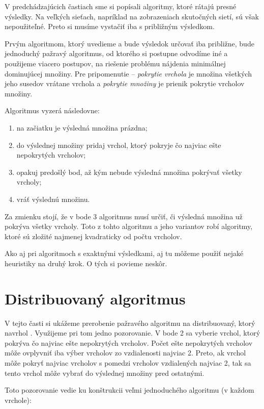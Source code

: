 V predchádzajúcich častiach sme si popísali algoritmy, ktoré rátajú presné 
výsledky. Na veľkých sieťach, napríklad na zobrazeniach skutočných sietí, 
sú však nepoužiteľné. Preto si musíme vystačiť iba s približným výsledkom. 

Prvým algoritmom, ktorý uvedieme a bude výsledok určovať iba približne, bude 
jednoduchý pažravý algoritmus, od ktorého si postupne odvodíme iné a použijeme 
viacero postupov, na riešenie problému nájdenia minimálnej dominujúcej množiny. 
Pre pripomenutie -- \emph{pokrytie vrchola} je množina všetkých jeho susedov 
vrátane vrchola a \emph{pokrytie množiny} je prienik pokrytie vrcholov množiny. 

Algoritmus vyzerá následovne:
\begin{enumerate}
	\item na začiatku je výsledná množina prázdna;
	\item do výslednej množiny pridaj vrchol, ktorý pokryje čo najviac ešte 
		nepokrytých vrcholov;
	\item opakuj predošlý bod, až kým nebude výsledná množina pokrývať všetky 
		vrcholy;
	\item vráť výslednú množinu.
\end{enumerate}

Za zmienku stojí, že v bode 3 algoritmus musí určiť, či výsledná množina už 
pokrýva všetky vrcholy. Toto z tohto algoritmu a jeho variantov robí algoritmy, 
ktoré sú zložité najmenej kvadraticky od počtu vrcholov.

Ako aj pri algoritmoch s exaktnými výsledkami, aj tu môžeme použiť nejaké 
heuristiky na druhý krok. O tých si povieme neskôr.

\section{Distribuovaný algoritmus}\label{sec:dist}

V tejto časti si ukážeme prerobenie pažravého algoritmu na distribuovaný, ktorý 
navrhol \citet{chapS}. 
Využijeme pri tom jedno pozorovanie. V bode 2 sa vyberie vrchol, ktorý pokrýva 
čo najviac ešte nepokrytých vrcholov. Počet ešte nepokrytých vrcholov môže 
ovplyvniť iba výber vrcholov zo vzdialenosti najviac 2. Preto, ak vrchol môže 
pokryť najviac vrcholov s pomedzi vrcholov vzdialených najviac 2, tak sa tento 
vrchol môže vybrať do výslednej množiny pred ostatnými. 

Toto pozorovanie vedie ku konštrukcii veľmi jednoduchého algoritmu (v každom 
vrchole):

